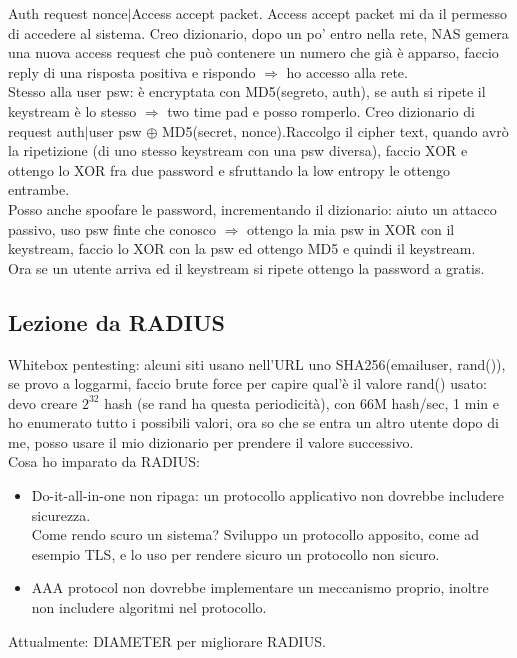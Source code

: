 \documentclass[16px]{article}
\begin{document}
Auth request nonce$|$Access accept packet. Access accept packet mi da il permesso di accedere al sistema. Creo dizionario, dopo un po' entro nella rete, NAS gemera una nuova access request che può contenere un numero che già è apparso, faccio reply di una risposta positiva e rispondo $\Rightarrow$ ho accesso alla rete.\\ Stesso alla user psw: è encryptata con MD5(segreto, auth), se auth si ripete il keystream è lo stesso $\Rightarrow$ two time pad e posso romperlo. Creo dizionario di request auth$|$user psw $\oplus$ MD5(secret, nonce).Raccolgo il cipher text, quando avrò la ripetizione (di uno stesso keystream con una psw diversa), faccio XOR e ottengo lo XOR fra due password e sfruttando la low entropy le ottengo entrambe.\\ Posso anche spoofare le password, incrementando il dizionario: aiuto un attacco passivo, uso psw finte che conosco $\Rightarrow$ ottengo la mia psw in XOR con il keystream, faccio lo XOR con la psw ed ottengo MD5 e quindi il keystream.\\ Ora se un utente arriva ed il keystream si ripete ottengo la password a gratis.
\subsection{Lezione da RADIUS}
Whitebox pentesting: alcuni siti usano nell'URL  uno SHA256(emailuser, rand()), se provo a loggarmi, faccio brute force per capire qual'è il valore rand() usato: devo creare $2^{32}$ hash (se rand ha questa periodicità), con 66M hash/sec, 1 min e ho enumerato tutto i possibili valori, ora so che se entra un altro utente dopo di me, posso usare il mio dizionario per prendere il valore successivo.\\ Cosa ho imparato da RADIUS:
\begin{itemize}
\item Do-it-all-in-one non ripaga: un protocollo applicativo non dovrebbe includere sicurezza.\\ Come rendo scuro un sistema? Sviluppo un protocollo apposito, come ad esempio TLS, e lo uso per rendere sicuro un protocollo non sicuro.
\item AAA protocol non dovrebbe implementare un meccanismo proprio, inoltre non includere algoritmi nel protocollo.
\end{itemize}
Attualmente: DIAMETER per migliorare RADIUS.
\end{document}
